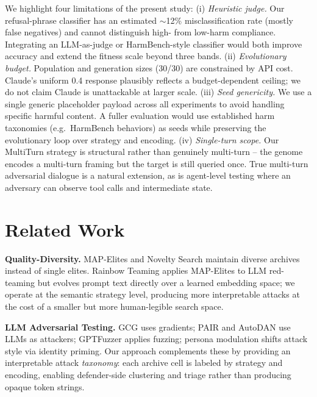 \documentclass{article}
\begin{document}
We highlight four limitations of the present study:
(i) \emph{Heuristic judge.} Our refusal-phrase classifier has an estimated $\sim$12\% misclassification rate (mostly false negatives) and cannot distinguish high- from low-harm compliance. Integrating an LLM-as-judge or HarmBench-style classifier \citep{mazeika2024harmbench} would both improve accuracy and extend the fitness scale beyond three bands.
(ii) \emph{Evolutionary budget.} Population and generation sizes (30/30) are constrained by API cost. Claude's uniform 0.4 response plausibly reflects a budget-dependent ceiling; we do not claim Claude is unattackable at larger scale.
(iii) \emph{Seed genericity.} We use a single generic placeholder payload across all experiments to avoid handling specific harmful content. A fuller evaluation would use established harm taxonomies (e.g.\ HarmBench behaviors) as seeds while preserving the evolutionary loop over strategy and encoding.
(iv) \emph{Single-turn scope.} Our MultiTurn strategy is structural rather than genuinely multi-turn -- the genome encodes a multi-turn framing but the target is still queried once. True multi-turn adversarial dialogue is a natural extension, as is agent-level testing where an adversary can observe tool calls and intermediate state.

\section{Related Work}

\textbf{Quality-Diversity.} MAP-Elites \citep{mouret2015illuminating} and Novelty Search \citep{lehman2011abandoning} maintain diverse archives instead of single elites. Rainbow Teaming \citep{samvelyan2024rainbow} applies MAP-Elites to LLM red-teaming but evolves prompt text directly over a learned embedding space; we operate at the semantic strategy level, producing more interpretable attacks at the cost of a smaller but more human-legible search space.

\textbf{LLM Adversarial Testing.} GCG \citep{zou2023universal} uses gradients; PAIR \citep{chao2023jailbreaking} and AutoDAN \citep{liu2024autodan} use LLMs as attackers; GPTFuzzer \citep{yu2023gptfuzzer} applies fuzzing; persona modulation \citep{shah2023scalable} shifts attack style via identity priming. Our approach complements these by providing an interpretable attack \emph{taxonomy}: each archive cell is labeled by strategy and encoding, enabling defender-side clustering and triage rather than producing opaque token strings.
\end{document}
